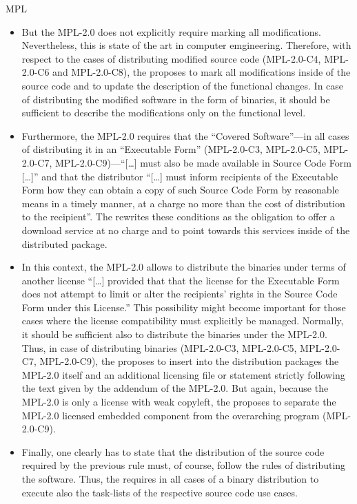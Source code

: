 \begin{license}{MPL}
\begin{itemize}
\item But the MPL-2.0 does not explicitly require marking all modifications.
  Nevertheless, this is state of the art in computer emgineering. Therefore,
  with respect to the cases of distributing modified source code (MPL-2.0-C4,
  MPL-2.0-C6 and MPL-2.0-C8), the \oslic{} proposes to mark all modifications
  inside of the source code and to update the description of the functional
  changes. In case of distributing the modified software in the form of
  binaries, it should be sufficient to describe the modifications only on the
  functional level. 
  
\item Furthermore, the MPL-2.0 requires that the \enquote{Covered Software}---in 
  all cases of distributing it in an \enquote{Executable Form} (MPL-2.0-C3,
  MPL-2.0-C5, MPL-2.0-C7, MPL-2.0-C9)---\enquote{[\ldots] must also be made
  available in Source Code Form [\ldots]} and that the distributor
  \enquote{[\ldots] must inform recipients of the Executable Form how they can
  obtain a copy of such Source Code Form by reasonable means in a timely manner,
  at a charge no more than the cost of distribution to the
  recipient}.  The \oslic{} rewrites these conditions as the
  obligation to offer a download service at no charge and to point towards this
  services inside of the distributed package.
  
\item In this context, the MPL-2.0 allows to distribute the binaries under terms
  of another license \enquote{[\ldots] provided that that the license for the
  Executable Form does not attempt to limit or alter the recipients’ rights in
  the Source Code Form under this License.} This possibility
  might become important for those cases where the license compatibility must
  explicitly be managed. Normally, it should be sufficient also to distribute
  the binaries under the MPL-2.0. Thus, in case of distributing binaries
  (MPL-2.0-C3, MPL-2.0-C5, MPL-2.0-C7, MPL-2.0-C9), the \oslic{} proposes to
  insert into the distribution packages the MPL-2.0 itself and an additional
  licensing file or statement strictly following the text given by the addendum
  of the MPL-2.0. But again, because the MPL-2.0 is only a
  license with weak copyleft, the \oslic{} proposes to separate the MPL-2.0
  licensed embedded component from the overarching program (MPL-2.0-C9).
  
\item Finally, one clearly has to state that the distribution of the source code
  required by the previous rule must, of course, follow the rules of distributing
  the software. Thus, the \oslic{} requires in all cases of a binary distribution
  to execute also the task-lists of the respective source code use cases.

\end{itemize}


\end{license}
%

